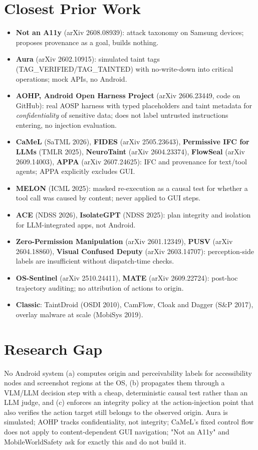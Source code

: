 \documentclass[11pt]{article}
\begin{document}
\section{Closest Prior Work}
\begin{itemize}
  \item \textbf{Not an A11y} (arXiv 2608.08939): attack taxonomy on Samsung devices; proposes provenance as a goal, builds nothing.
  \item \textbf{Aura} (arXiv 2602.10915): simulated taint tags (TAG\_VERIFIED/TAG\_TAINTED) with no-write-down into critical operations; mock APIs, no Android.
  \item \textbf{AOHP, Android Open Harness Project} (arXiv 2606.23449, code on GitHub): real AOSP harness with typed placeholders and taint metadata for \emph{confidentiality} of sensitive data; does not label untrusted instructions entering, no injection evaluation.
  \item \textbf{CaMeL} (SaTML 2026), \textbf{FIDES} (arXiv 2505.23643), \textbf{Permissive IFC for LLMs} (TMLR 2025), \textbf{NeuroTaint} (arXiv 2604.23374), \textbf{FlowSeal} (arXiv 2609.14003), \textbf{APPA} (arXiv 2607.24625): IFC and provenance for text/tool agents; APPA explicitly excludes GUI.
  \item \textbf{MELON} (ICML 2025): masked re-execution as a causal test for whether a tool call was caused by content; never applied to GUI steps.
  \item \textbf{ACE} (NDSS 2026), \textbf{IsolateGPT} (NDSS 2025): plan integrity and isolation for LLM-integrated apps, not Android.
  \item \textbf{Zero-Permission Manipulation} (arXiv 2601.12349), \textbf{PUSV} (arXiv 2604.18860), \textbf{Visual Confused Deputy} (arXiv 2603.14707): perception-side labels are insufficient without dispatch-time checks.
  \item \textbf{OS-Sentinel} (arXiv 2510.24411), \textbf{MATE} (arXiv 2609.22724): post-hoc trajectory auditing; no attribution of actions to origin.
  \item \textbf{Classic}: TaintDroid (OSDI 2010), CamFlow, Cloak and Dagger (S\&P 2017), overlay malware at scale (MobiSys 2019).
\end{itemize}

\section{Research Gap}
No Android system (a) computes origin and perceivability labels for accessibility nodes and screenshot regions at the OS, (b) propagates them through a VLM/LLM decision step with a cheap, deterministic causal test rather than an LLM judge, and (c) enforces an integrity policy at the action-injection point that also verifies the action target still belongs to the observed origin. Aura is simulated; AOHP tracks confidentiality, not integrity; CaMeL's fixed control flow does not apply to content-dependent GUI navigation; "Not an A11y" and MobileWorldSafety ask for exactly this and do not build it.
\end{document}
